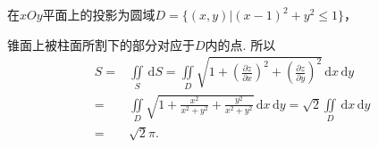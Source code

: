 \documentclass[../Main.tex]{subfiles}
\begin{document}
\begin{enumerate}
          在$xOy$平面上的投影为圆域$D=\{(x,y)|(x-1)^{2}+y^{2}\leq 1\}$，

          锥面上被柱面所割下的部分对应于$D$内的点. 所以
          \[
              \begin{aligned}
                  S = & \iint\limits_{S}\,\mathrm{d}S = \iint\limits_{D}\sqrt{1+\left(\frac{\partial z}{\partial x}\right)^2+\left(\frac{\partial z}{\partial y}\right)^2}\,\mathrm{d}x\,\mathrm{d}y \\
                  =   & \iint\limits_{D}\sqrt{1+\frac{x^2}{x^2+y^2}+\frac{y^2}{x^2+y^2}}\,\mathrm{d}x\,\mathrm{d}y = \sqrt{2}\iint\limits_{D}\,\mathrm{d}x\,\mathrm{d}y                              \\
                  =   & \sqrt{2}\pi.
              \end{aligned}
          \]
\end{enumerate}
\end{document}
